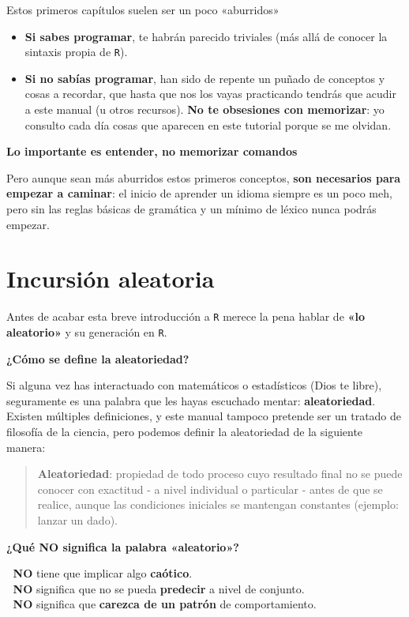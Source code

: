 \documentclass[11pt,]{book}
\providecommand{\tightlist}{%
  \setlength{\itemsep}{0pt}\setlength{\parskip}{0pt}}
\begin{document}
Estos primeros capítulos suelen ser un poco «aburridos»

\begin{itemize}
\tightlist
\item
  \textbf{Si sabes programar}, te habrán parecido triviales (más allá de conocer la sintaxis propia de \texttt{R}).
\item
  \textbf{Si no sabías programar}, han sido de repente un puñado de conceptos y cosas a recordar, que hasta que nos los vayas practicando tendrás que acudir a este manual (u otros recursos). \textbf{No te obsesiones con memorizar}: yo consulto cada día cosas que aparecen en este tutorial porque se me olvidan.
\end{itemize}

\textbf{Lo importante es entender, no memorizar comandos}

Pero aunque sean más aburridos estos primeros conceptos, \textbf{son necesarios para empezar a caminar}: el inicio de aprender un idioma siempre es un poco meh, pero sin las reglas básicas de gramática y un mínimo de léxico nunca podrás empezar.

\hypertarget{aleatorio_1}{%
\section{Incursión aleatoria}\label{aleatorio_1}}

Antes de acabar esta breve introducción a \texttt{R} merece la pena hablar de \textbf{«lo aleatorio»} y su generación en \texttt{R}.

\textbf{¿Cómo se define la aleatoriedad?}

Si alguna vez has interactuado con matemáticos o estadísticos (Dios te libre), seguramente es una palabra que les hayas escuchado mentar: \textbf{aleatoriedad}. Existen múltiples definiciones, y este manual tampoco pretende ser un tratado de filosofía de la ciencia, pero podemos definir la aleatoriedad de la siguiente manera:

\begin{quote}
\textbf{Aleatoriedad}: propiedad de todo proceso cuyo resultado final no se puede conocer con exactitud - a nivel individual o particular - antes de que se realice, aunque las condiciones iniciales se mantengan constantes (ejemplo: lanzar un dado).
\end{quote}

\textbf{¿Qué NO significa la palabra «aleatorio»?}

🛑 \textbf{NO} tiene que implicar algo \textbf{caótico}.\\
🛑 \textbf{NO} significa que no se pueda \textbf{predecir} a nivel de conjunto.\\
🛑 \textbf{NO} significa que \textbf{carezca de un patrón} de comportamiento.
\end{document}
